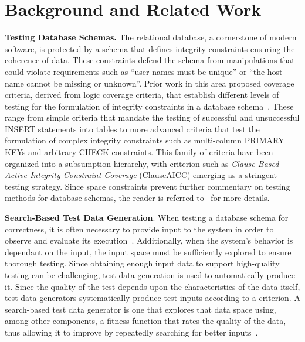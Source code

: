 
\section{Background and Related Work}




{\bf Testing Database Schemas.} The relational database, a cornerstone of modern software, is protected by a schema that
defines integrity constraints ensuring the coherence of data. These constraints defend the schema from manipulations
that could violate requirements such as ``user names must be unique'' or ``the host name cannot be missing or unknown''.
Prior work in this area proposed coverage criteria, derived from logic coverage criteria, that establish different
levels of testing for the formulation of integrity constraints in a database schema~\cite{mcminn2015}. These range from
simple criteria that mandate the testing of successful and unsuccessful INSERT statements into tables to more advanced
criteria that test the formulation of complex integrity constraints such as multi-column PRIMARY KEYs and arbitrary
CHECK constraints. This family of criteria have been organized into a subsumption hierarchy, with criterion such as {\em
Clause-Based Active Integrity Constraint Coverage} (ClauseAICC) emerging as a stringent testing strategy. Since space
constraints prevent further commentary on testing methods for database schemas, the reader is referred
to~\cite{mcminn2015} for more details.

{\bf Search-Based Test Data Generation}. When testing a database schema for correctness, it is often necessary to
provide input to the system in order to observe and evaluate its execution~\cite{ammann2008}. Additionally, when the
system's behavior is dependant on the input, the input space must be sufficiently explored to ensure thorough testing.
Since obtaining enough input data to support high-quality testing can be challenging, test data generation is used to
automatically produce it. Since the quality of the test depends upon the characteristics of the data itself, test data
generators systematically produce test inputs according to a criterion. A search-based test data generator is one that
explores that data space using, among other components, a fitness function that rates the quality of the data, thus
allowing it to improve by repeatedly searching for better inputs~\cite{mcminn2004a}.

